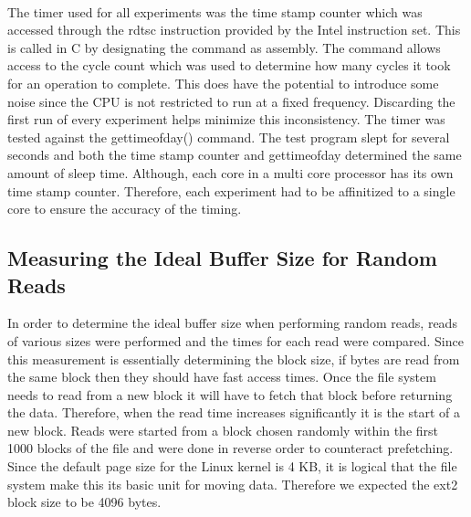 \documentclass[letterpaper,twocolumn,10pt]{article}
\begin{document}
\paragraph{}
The timer used for all experiments was the time stamp counter which was accessed through the rdtsc instruction provided by the Intel instruction set. 
This is called in C by designating the command as assembly. 
The command allows access to the cycle count which was used to determine how many cycles it took for an operation to complete. 
This does have the potential to introduce some noise since the CPU is not restricted to run at a fixed frequency. 
Discarding the first run of every experiment helps minimize this inconsistency. 
The timer was tested against the gettimeofday() command. 
The test program slept for several seconds and both the time stamp counter and gettimeofday determined the same amount of sleep time. 
Although, each core in a multi core processor has its own time stamp counter.
Therefore, each experiment had to be affinitized to a single core to ensure the accuracy of the timing. 

\subsection{Measuring the Ideal Buffer Size for Random Reads}

In order to determine the ideal buffer size when performing random reads, reads of various sizes were performed and the times for each read were compared. 
Since this measurement is essentially determining the block size, if bytes are read from the same block then they should have fast access times. 
Once the file system needs to read from a new block it will have to fetch that block before returning the data. 
Therefore, when the read time increases significantly it is the start of a new block.
Reads were started from a block chosen randomly within the first 1000 blocks of the file and were done in reverse order to counteract prefetching. 
Since the default page size for the Linux kernel is 4 KB, it is logical that the file system make this its basic unit for moving data. 
Therefore we expected the ext2 block size to be 4096 bytes.
\end{document}
